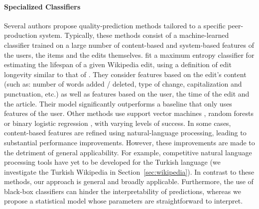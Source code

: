 \paragraph{Specialized Classifiers}
Several authors propose quality-prediction methods tailored to a specific peer-production system.
Typically, these methods consist of a machine-learned classifier trained on a large number of content-based and system-based features of the users, the items and the edits themselves.
\citet{druck2008learning} fit a maximum entropy classifier for estimating the lifespan of a given Wikipedia edit, using a definition of edit longevity similar to that of \citet{adler2007content}.
They consider features based on the edit's content (such as: number of words added / deleted, type of change, capitalization and punctuation, etc.) as well as features based on the user, the time of the edit and the article.
Their model significantly outperforms a baseline that only uses features of the user.
Other methods use support vector machines \citep{bronner2012user}, random forests \citep{bronner2012user, javanmardi2011vandalism} or binary logistic regression \citep{potthast2008automatic}, with varying levels of success.
In some cases, content-based features are refined using natural-language processing, leading to substantial performance improvements.
However, these improvements are made to the detriment of general applicability.
For example, competitive natural language processing tools have yet to be developed for the Turkish language (we investigate the Turkish Wikipedia in Section~\ref{sec:wikipedia}).
In contrast to these methods, our approach is general and broadly applicable.
Furthermore, the use of black-box classifiers can hinder the interpretability of predictions, whereas we propose a statistical model whose parameters are straightforward to interpret.

